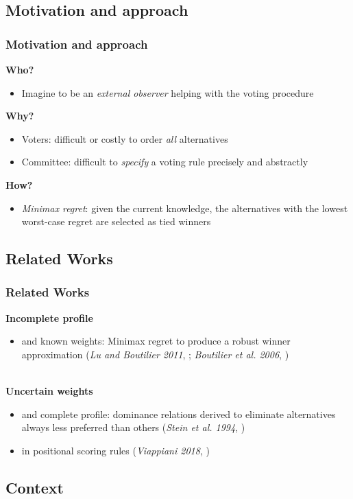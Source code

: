 \documentclass{beamer}
\begin{document}
\subsection{Motivation and approach}
\begin{frame}
	\frametitle{Motivation and approach}
	\textbf{Who?}
	\begin{itemize}
		\item Imagine to be an \emph{external observer} helping with the voting procedure
	\end{itemize}
	\textbf{Why?}
	\begin{itemize}
		\item Voters: difficult or costly to order \emph{all} alternatives
		\item Committee: difficult to \emph{specify} a voting rule precisely and abstractly
	\end{itemize}
	\textbf{How?}
	\begin{itemize}
		\item \emph{Minimax regret}: given the current knowledge, the alternatives with the lowest worst-case regret are selected as tied winners
	\end{itemize}		
\end{frame}

\subsection{Related Works}
\begin{frame}
	\frametitle{Related Works}
	\textbf{Incomplete profile}  
	\begin{itemize}
		\item and known weights: Minimax regret to produce a robust winner approximation (\textit{Lu and Boutilier 2011}, \cite{Lu2011}; \textit{Boutilier et al. 2006}, \cite{Boutilier2006})
	\end{itemize}~\\
	\textbf{Uncertain weights} 
	\begin{itemize}
		\item and complete profile: dominance relations derived to eliminate alternatives always less preferred than others (\textit{Stein et al. 1994}, \cite{Stein1994})
		\item in positional scoring rules (\textit{Viappiani 2018}, \cite{Viappiani2018})
	\end{itemize}
\end{frame}

\subsection{Context}
\end{document}
